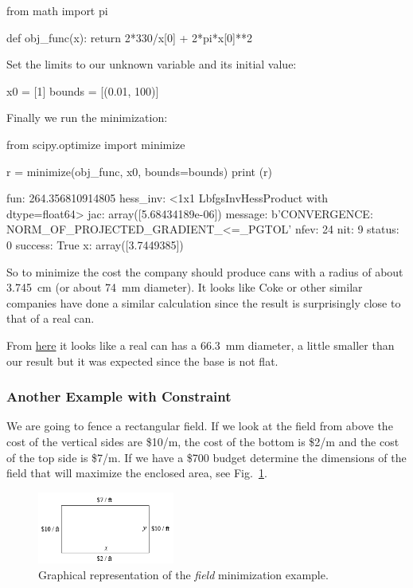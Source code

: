 \begin{ipython}
from math import pi

def obj_func(x):
    return 2*330/x[0] + 2*pi*x[0]**2
\end{ipython}
\noindent
Set the limits to our unknown variable and its initial value:

\begin{ipython}
x0 = [1]
bounds = [(0.01, 100)]
\end{ipython}
\noindent
Finally we run the minimization:

\begin{ipython}
from scipy.optimize import minimize

r = minimize(obj_func, x0, bounds=bounds)
print (r)
\end{ipython}
\begin{ioutput}
      fun: 264.356810914805
 hess_inv: <1x1 LbfgsInvHessProduct with dtype=float64>
      jac: array([5.68434189e-06])
  message: b'CONVERGENCE: NORM_OF_PROJECTED_GRADIENT_<=_PGTOL'
     nfev: 24
      nit: 9
   status: 0
  success: True
        x: array([3.7449385])
\end{ioutput}

\begin{curiosity}
So to minimize the cost the company should produce cans with a radius of about 3.745~cm (or about 74~mm diameter). It looks like Coke or other similar companies have done a similar calculation since the result is surprisingly close to that of a real can. 

From \href{	https://www.ball.com/eu/solutions/markets-capabilities/capabilities/beverage-cans/standard-range
}{here} it looks like a real can has a 66.3~mm diameter, a little smaller than our result but it was expected since the base is not flat.    
\end{curiosity}

\subsubsection{Another Example with Constraint}
\label{example-with-constraint}

We are going to fence a rectangular field. If we look at the field
from above the cost of the vertical sides are \$10/m, the cost of the
bottom is \$2/m and the cost of the top side is \$7/m. If we have a \$700 budget determine
the dimensions of the field that will maximize the enclosed area, see Fig.~\ref{fig:field}.

\begin{figure}[h]
\centering
\includegraphics[width=0.4\textwidth]{figures/field.png}
\caption{Graphical representation of the \emph{field} minimization example.}
\label{fig:field}
\end{figure}

